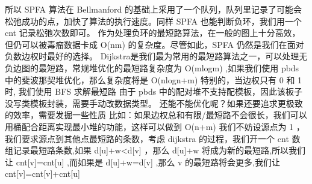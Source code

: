 {}所以 \markdownRendererDollarSign{}SPFA\markdownRendererDollarSign{} 算法在 \markdownRendererDollarSign{}Bellmanford\markdownRendererDollarSign{} 的基础上采用了一个队列，队列里记录了可能会松弛成功的点，加快了算法的执行速度。同样 \markdownRendererDollarSign{}SPFA\markdownRendererDollarSign{} 也能判断负环，我们用一个 \markdownRendererDollarSign{}cnt\markdownRendererDollarSign{} 记录松弛次数即可。\markdownRendererParagraphSeparator
{}作为处理负环的最短路算法，在一般的图上十分高效，但仍可以被毒瘤数据卡成 \markdownRendererDollarSign{}O(nm)\markdownRendererDollarSign{} 的复杂度。尽管如此，\markdownRendererDollarSign{}SPFA\markdownRendererDollarSign{} 仍然是我们在面对负数边权时最好的选择。\markdownRendererInterblockSeparator
{}\markdownRendererInterblockSeparator
{}
\markdownRendererSectionEnd \markdownRendererSectionBegin
{}\markdownRendererInterblockSeparator
{}Dijkstra是我们最为常用的最短路算法之一，可以处理无负边图的最短路，常规堆优化的最短路复杂度为\markdownRendererDollarSign{} O(mlogm) \markdownRendererDollarSign{},如果我们使用\markdownRendererDollarSign{} pbds \markdownRendererDollarSign{}中的斐波那契堆优化，那么复杂度将是\markdownRendererDollarSign{} O(nlogn+m) \markdownRendererDollarSign{}\markdownRendererParagraphSeparator
{}特别的，当边权只有 \markdownRendererDollarSign{}0\markdownRendererDollarSign{} 和 \markdownRendererDollarSign{}1\markdownRendererDollarSign{} 时, 我们使用 \markdownRendererDollarSign{}BFS\markdownRendererDollarSign{} 求解最短路\markdownRendererParagraphSeparator
{}由于\markdownRendererDollarSign{} pbds \markdownRendererDollarSign{}中的配对堆不支持配模板，因此该板子没写类模板封装，需要手动改数据类型。\markdownRendererInterblockSeparator
{}\markdownRendererInterblockSeparator
{}还能不能优化呢？如果还要追求更极致的效率，需要发掘一些性质\markdownRendererParagraphSeparator
{}比如：如果边权总和有限/最短路不会很长，我们可以用桶配合距离实现最小堆的功能，这样可以做到\markdownRendererDollarSign{} O(n+m) \markdownRendererDollarSign{}\markdownRendererInterblockSeparator
{}
\markdownRendererSectionEnd \markdownRendererSectionBegin
{}\markdownRendererInterblockSeparator
{}我们不妨设源点为\markdownRendererDollarSign{} 1 \markdownRendererDollarSign{}，我们要求源点到其他点最短路的条数，考虑\markdownRendererDollarSign{} dijkstra \markdownRendererDollarSign{}的过程，我们开一个\markdownRendererDollarSign{} cnt \markdownRendererDollarSign{}数组记录最短路条数,如果\markdownRendererDollarSign{} d[u]+w<d[v] \markdownRendererDollarSign{}，那么\markdownRendererDollarSign{} d[u]+w \markdownRendererDollarSign{}将成为新的最短路,所以我们让\markdownRendererDollarSign{} cnt[v]=cnt[u] \markdownRendererDollarSign{},而如果是\markdownRendererDollarSign{} d[u]+w=d[v] \markdownRendererDollarSign{},那么\markdownRendererDollarSign{} v \markdownRendererDollarSign{}的最短路将会更多,我们让\markdownRendererDollarSign{} cnt[v]=cnt[v]+cnt[u] \markdownRendererDollarSign{}\markdownRendererParagraphSeparator
